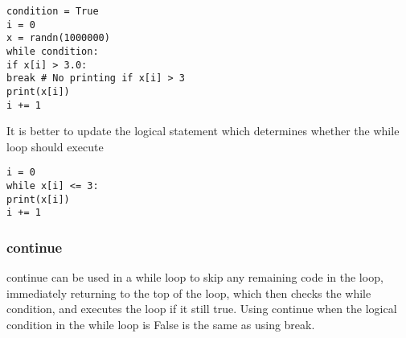 \documentclass[KSmain.tex]{subfiles}
\begin{document}
\begin{framed}
\begin{verbatim}
condition = True
i = 0
x = randn(1000000)
while condition:
if x[i] > 3.0:
break # No printing if x[i] > 3
print(x[i])
i += 1
\end{verbatim}
\end{framed}

It is better to update the logical statement which determines whether the while loop should execute

\begin{framed}
\begin{verbatim}
i = 0
while x[i] <= 3:
print(x[i])
i += 1
\end{verbatim}
\end{framed}
\subsubsection{continue}
continue can be used in a while loop to skip any remaining code in the loop, immediately returning to the
top of the loop, which then checks the while condition, and executes the loop if it still true. Using continue
when the logical condition in the while loop is False is the same as using break.
\end{document}

